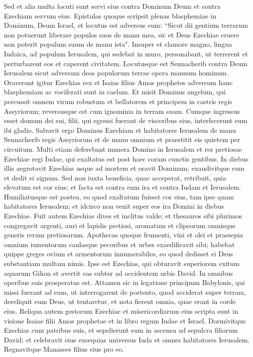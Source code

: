 \begin{biblechapter}
\verse Sed et alia multa locuti sunt servi eius contra Dominum Deum et contra Ezechiam servum eius. 
\verse Epistulas quoque scripsit plenas blasphemiae in Dominum, Deum Israel, et locutus est adversus eum: “Sicut dii gentium terrarum non potuerunt liberare populos suos de manu mea, sic et Deus Ezechiae eruere non poterit populum suum de manu ista". 
\verse Insuper et clamore magno, lingua Iudaica, ad populum Ierusalem, qui sedebat in muro, personabant, ut terrerent et perturbarent eos et caperent civitatem.  
\verse Locutusque est Sennacherib contra Deum Ierusalem sicut adversum deos populorum terrae opera manuum hominum. 
\verse Oraverunt igitur Ezechias rex et Isaias filius Amos prophetes adversum hanc blasphemiam ac vociferati sunt in caelum. 
\verse Et misit Dominus angelum, qui percussit omnem virum robustum et bellatorem et principem in castris regis Assyriorum; reversusque est cum ignominia in terram suam. Cumque ingressus esset domum dei sui, filii, qui egressi fuerant de visceribus eius, interfecerunt eum ibi gladio. 
\verse Salvavit ergo Dominus Ezechiam et habitatores Ierusalem de manu Sennacherib regis Assyriorum et de manu omnium et praestitit eis quietem per circuitum. 
\verse Multi etiam deferebant munera Domino in Ierusalem et res pretiosas Ezechiae regi Iudae, qui exaltatus est post haec coram cunctis gentibus. 
\verse In diebus illis aegrotavit Ezechias usque ad mortem et oravit Dominum; exaudivitque eum et dedit ei signum. 
\verse Sed non iuxta beneficia, quae acceperat, retribuit, quia elevatum est cor eius; et facta est contra eum ira et contra Iudam et Ierusalem. 
\verse Humiliatusque est postea, eo quod exaltatum fuisset cor eius, tam ipse quam habitatores Ierusalem; et idcirco non venit super eos ira Domini in diebus Ezechiae. 
\verse Fuit autem Ezechias dives et inclitus valde; et thesauros sibi plurimos congregavit argenti, auri et lapidis pretiosi, aromatum et clipeorum omnisque generis rerum pretiosarum. 
\verse Apothecas quoque frumenti, vini et olei et praesepia omnium iumentorum caulasque pecoribus 
\verse et urbes exaedificavit sibi; habebat quippe greges ovium et armentorum innumerabiles, eo quod dedisset ei Deus substantiam multam nimis. 
\verse Ipse est Ezechias, qui obturavit superiorem exitum aquarum Gihon et avertit eas subter ad occidentem urbis David. In omnibus operibus suis prosperatus est. 
\verse Attamen sic in legatione principum Babylonis, qui missi fuerant ad eum, ut interrogarent de portento, quod acciderat super terram, dereliquit eum Deus, ut tentaretur, et nota fierent omnia, quae erant in corde eius. 
\verse Reliqua autem gestorum Ezechiae et misericordiarum eius scripta sunt in visione Isaiae filii Amos prophetae et in libro regum Iudae et Israel. 
\verse Dormivitque Ezechias cum patribus suis, et sepelierunt eum in ascensu ad sepulcra filiorum David; et celebravit eius exsequias universus Iuda et omnes habitatores Ierusalem. Regnavitque Manasses filius eius pro eo. 
\end{biblechapter}

